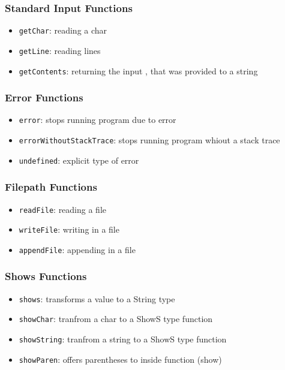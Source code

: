 \documentclass[a4paper, titlepage, twoside]{article}
\begin{document}
\subsubsection{Standard Input Functions}
\label{sec:org4168a3b}

\begin{itemize}
\item \texttt{getChar}: reading a char

\item \texttt{getLine}: reading lines

\item \texttt{getContents}: returning the input , that was provided to a string
\end{itemize}

\subsubsection{Error Functions}
\label{sec:orgf93a070}

\begin{itemize}
\item \texttt{error}: stops running program due to error

\item \texttt{errorWithoutStackTrace}: stops running program whiout a stack trace

\item \texttt{undefined}: explicit type of error
\end{itemize}

\subsubsection{Filepath Functions}
\label{sec:org2424492}

\begin{itemize}
\item \texttt{readFile}: reading a file

\item \texttt{writeFile}: writing in a file

\item \texttt{appendFile}: appending in a file
\end{itemize}

\subsubsection{Shows Functions}
\label{sec:org68f248e}

\begin{itemize}
\item \texttt{shows}: transforms a value to a String type

\item \texttt{showChar}: tranfrom a char to a ShowS type function

\item \texttt{showString}: tranfrom a string to a ShowS type function

\item \texttt{showParen}: offers parentheses to inside function (show)
\end{itemize}
\end{document}
